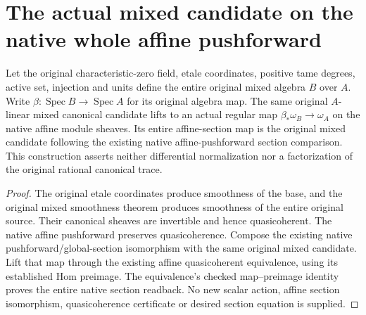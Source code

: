 \section{The actual mixed candidate on the native whole affine pushforward}

\begin{lemma}
\label{lem:kn-canonical-mixed-native-sheaf-candidate}
\leanok
Let the original characteristic-zero field, etale coordinates, positive tame
degrees, active set, injection and units define the entire original mixed
algebra $B$ over $A$. Write $\beta:\operatorname{Spec}B\to\operatorname{Spec}A$
for its original algebra map. The same original $A$-linear mixed canonical
candidate lifts to an actual regular map
$\beta_*\omega_B\to\omega_A$ on the native affine module sheaves.
Its entire affine-section map is the original mixed candidate following
the existing native affine-pushforward section comparison.
This construction asserts neither differential normalization nor a
factorization of the original rational canonical trace.
\end{lemma}
\begin{proof}
The original etale coordinates produce smoothness of the base, and the
original mixed smoothness theorem produces smoothness of the entire
original source. Their canonical sheaves are invertible and hence
quasicoherent. The native affine pushforward preserves quasicoherence.
Compose the existing native pushforward/global-section isomorphism with
the same original mixed candidate. Lift that map through the existing
affine quasicoherent equivalence, using its established Hom preimage.
The equivalence's checked map--preimage identity proves the entire native
section readback. No new scalar action, affine section isomorphism,
quasicoherence certificate or desired section equation is supplied.
\end{proof}
